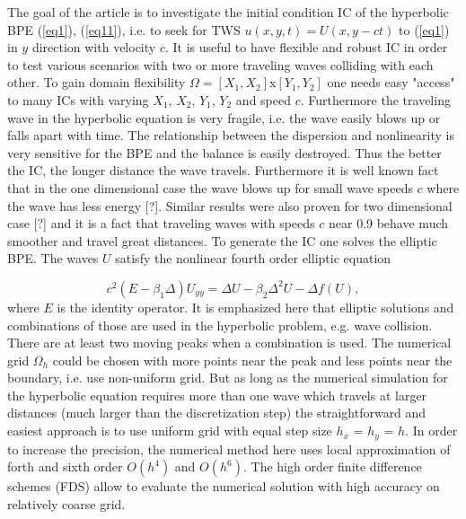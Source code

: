 \documentclass[preprint]{elsarticle}
\newcommand{\rf}[1]{(\ref{#1})}
\begin{document}
The goal of the article is to investigate the initial condition IC of the hyperbolic BPE \rf{eq1}, \rf{eq11}, i.e. to seek for TWS $u(x,y,t)=U(x,y-ct)$ to \rf{eq1} in $y$ direction with velocity $c$. It is useful to have flexible and robust IC in order to test various scenarios with two or more traveling waves colliding with each other. To gain domain flexibility $\Omega = [X_1, X_2]$x$[Y_1, Y_2]$ one needs easy "access" to many ICs with varying $X_1$, $X_2$, $Y_1$, $Y_2$ and speed $c$. Furthermore the traveling wave in the hyperbolic equation is very fragile, i.e. the wave easily blows up or falls apart with time. The relationship between the dispersion and nonlinearity is very sensitive for the BPE and the balance is easily destroyed. Thus the better the IC, the longer distance the wave travels. Furthermore it is well known fact that in the one dimensional case the wave blows up for small wave speeds $c$ where the wave has less energy [?]. Similar results were also proven for two dimensional case [?] and it is a fact that traveling waves with speeds $c$ near 0.9 behave much smoother and travel great distances. To generate the IC one solves the elliptic BPE. The waves $U$ satisfy the nonlinear fourth order elliptic equation

\begin{equation}\label{eq2}
c^2 (E-\beta_1 \Delta) U_{yy} = \Delta U -\beta_2 \Delta^2 U - \Delta f(U),
\end{equation}
where $E$ is the identity operator. It is emphasized here that elliptic solutions and combinations of those are used in the hyperbolic problem, e.g. wave collision. There are at least two moving peaks when a combination is used. The numerical grid $\Omega_h$ could be chosen with more points near the peak and less points near the boundary, i.e. use non-uniform grid. But as long as the numerical simulation for the hyperbolic equation requires more than one wave which travels at larger distances (much larger than the discretization step) the straightforward and easiest approach is to use uniform grid with equal step size $h_x$ = $h_y$ = $h$. In order to increase the precision, the numerical method here uses local approximation of forth and sixth order $O(h^4)$ and $O(h^6)$. The high order finite difference schemes (FDS) allow to evaluate the numerical solution with high accuracy on relatively coarse grid.
\end{document}
